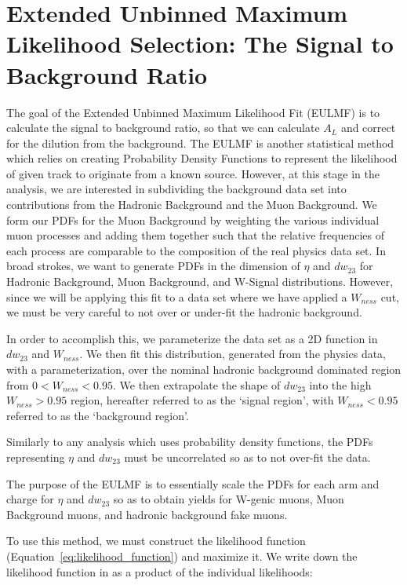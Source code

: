 \clearpage
\section{Extended Unbinned Maximum Likelihood Selection: The Signal to
Background Ratio}
\label{sec:sbr}

The goal of the Extended Unbinned Maximum Likelihood Fit (EULMF) is to calculate
the signal to background ratio, so that we can calculate $A_L$ and correct for
the dilution from the background. The EULMF is another statistical method which
relies on creating Probability Density Functions to represent the likelihood of
given track to originate from a known source. However, at this stage in the
analysis, we are interested in subdividing the background data set into
contributions from the Hadronic Background and the Muon Background. We form our
PDFs for the Muon Background by weighting the various individual muon
processes and adding them together such that the relative frequencies of each
process are comparable to the composition of the real physics data set. In broad
strokes, we want to generate PDFs in the dimension of $\eta$ and $dw_{23}$ for
Hadronic Background, Muon Background, and W-Signal distributions. However, since
we will be applying this fit to a data set where we have applied a $W_{ness}$
cut, we must be very careful to not over or under-fit the hadronic background. 

In order to accomplish this, we parameterize the data set as a 2D function in
$dw_{23}$ and $W_{ness}$. We then fit this distribution, generated from the
physics data, with a parameterization, over the nominal hadronic background
dominated region from $0 < W_{ness} < 0.95$. We then extrapolate the shape
of $dw_{23}$ into the high $W_{ness} > 0.95$ region, hereafter referred to as
the `signal region', with $W_{ness} < 0.95$ referred to as the `background
region'.

Similarly to any analysis which uses probability density functions, the PDFs
representing $\eta$ and $dw_{23}$ must be uncorrelated so as to not over-fit
the data.

The purpose of the EULMF is to essentially scale the PDFs for each arm and
charge for $\eta$ and $dw_{23}$ so as to obtain yields for W-genic muons, Muon
Background muons, and hadronic background fake muons.

To use this method, we must construct the likelihood function
(Equation~\ref{eq:likelihood_function}) and maximize it. We write down the
likelihood function in as a product of the individual likelihoods:


